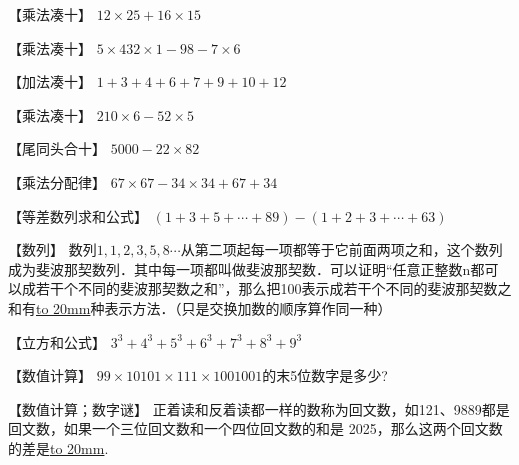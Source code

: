 \item {
    【乘法凑十】
    $12\times 25 + 16\times 15$
    \vspace{1cm}
}

\item {
    【乘法凑十】
    $5\times 432\times 1 - 98 - 7\times 6$
    \vspace{1cm}
}

\item {
    【加法凑十】
    $1+3+4+6+7+9+10 + 12$
    \vspace{1cm}
}

\item {
    【乘法凑十】
    $210\times 6 - 52\times 5$
    \vspace{1cm}
}

\item {
    【尾同头合十】
    $5000- 22\times 82$  
    \vspace{1cm}
}

\item {
    【乘法分配律】
    $67\times 67 - 34\times 34 + 67 + 34$
    \vspace{1cm}
}

\item {
    【等差数列求和公式】
    $(1+3+5+\cdots + 89) - (1+2+3+\cdots + 63)$  
    \vspace{1cm}
}

\item {
    【数列】
    数列$1, 1,2,3,5,8\cdots$从第二项起每一项都等于它前面两项之和，这个数列成为斐波那契数列．其中每一项都叫做斐波那契数．可以证明“任意正整数n都可以成若干个不同的斐波那契数之和”，那么把100表示成若干个不同的斐波那契数之和有\underline{\hbox to 20mm{}}种表示方法．（只是交换加数的顺序算作同一种）  
    \vspace{1cm}
}

\item {
    【立方和公式】
    $3^3 + 4^3 + 5^3 + 6^3 + 7^3 + 8^3 + 9^3$
    \vspace{1cm}
}

\item {
    【数值计算】
    $99\times 10101\times 111\times 1001001$的末5位数字是多少?
    \vspace{1cm}
}

\item {
    【数值计算；数字谜】
    正着读和反着读都一样的数称为回文数，如121、9889都是回文数，如果一个三位回文数和一个四位回文数的和是 2025，那么这两个回文数的差是\underline{\hbox to 20mm{}}.
    \vspace{1cm}
}

